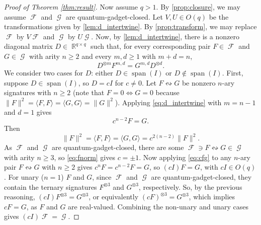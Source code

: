\documentclass{theoretics}
\DeclareMathOperator{\spn}{span}
\DeclareMathOperator{\rr}{\mathbb{R}}
\DeclareMathOperator{\fc}{\mathcal{F}}
\DeclareMathOperator{\gc}{\mathcal{G}}
\begin{document}
\begin{proof}[Proof of Theorem \ref{thm:result}]
    Now assume $q > 1$. By \autoref{prop:closure}, we may assume $\fc$ and $\gc$ are 
    quantum-gadget-closed. Let $V,U \in O(q)$ be the transformations given by 
    \autoref{lem:d_intertwine}.
    By \autoref{prop:transform}, we may replace $\fc$ by $V \fc$ and $\gc$ by $U \gc$.
    Now, by \autoref{lem:d_intertwine},
    there is a nonzero diagonal matrix $D \in \rr^{q \times q}$ such that,
    for every corresponding pair $F \in \fc$ and $G \in \gc$ with
    arity $n \geq 2$ and every $m,d \geq 1$ with $m+d = n$,
    \begin{equation}
        D^{\otimes m} F^{m,d} = G^{m,d} D^{\otimes d}.
        \label{eq:d_intertwine}
    \end{equation}
    We consider two cases for $D$: either $D \in \spn(I)$ or $D \not\in \spn(I)$.
    First, suppose $D \in \spn(I)$, so $D = cI$ for $c \neq 0$. 
    Let $F \leftrightsquigarrow G$ be nonzero $n$-ary signatures with $n \geq 2$
    (note that $F = 0 \iff G = 0$ because
    $\|F\|^2 = \langle F,F\rangle = \langle G,G\rangle = \|G\|^2$).
    Applying \eqref{eq:d_intertwine} with $m = n-1$ and $d = 1$ gives
    \begin{equation}
        \label{eq:cfg}
        c^{n-2} F = G.
    \end{equation}
    Then
    \begin{equation}
        \label{eq:fnorm}
        \|F\|^2 = \langle F,F\rangle = \langle G,G\rangle = c^{2(n-2)}\|F\|^2.
    \end{equation}
    As $\fc$ and $\gc$ are quantum-gadget-closed, there are some
    $\fc \ni F \leftrightsquigarrow G \in \gc$ with arity $n \geq 3$, 
    so \eqref{eq:fnorm} gives $c = \pm 1$.
    Now applying \eqref{eq:cfg} to any $n$-ary pair $F \leftrightsquigarrow G$ with $n \geq 2$
    gives $c^nF = c^{n-2}F = G$, so $(cI) F = G$, with $cI \in O(q)$.
    For unary ($n=1$) $F$ and $G$, since $\fc$ and $\gc$ are quantum-gadget-closed, they contain the 
    ternary signatures $F^{\otimes 3}$ and $G^{\otimes 3}$, respectively. So,
    by the previous reasoning, $(cI) F^{\otimes 3} = G^{\otimes 3}$, or equivalently
    $(cF)^{\otimes 3} = G^{\otimes 3}$, which implies $cF = G$, as $F$ and $G$ are 
    real-valued. Combining the non-unary and unary cases gives $(cI) \fc = \gc$.


\end{proof}
\end{document}
